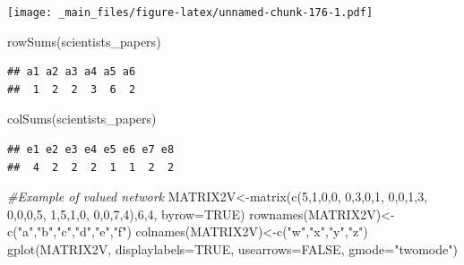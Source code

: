 \documentclass[
  notitlepage,
  onecolumn,
  openany]{book}
\newenvironment{Shaded}{\begin{snugshade}}{\end{snugshade}}
\newcommand{\AttributeTok}[1]{\textcolor[rgb]{0.77,0.63,0.00}{#1}}
\newcommand{\CommentTok}[1]{\textcolor[rgb]{0.56,0.35,0.01}{\textit{#1}}}
\newcommand{\ConstantTok}[1]{\textcolor[rgb]{0.00,0.00,0.00}{#1}}
\newcommand{\DecValTok}[1]{\textcolor[rgb]{0.00,0.00,0.81}{#1}}
\newcommand{\FunctionTok}[1]{\textcolor[rgb]{0.00,0.00,0.00}{#1}}
\newcommand{\NormalTok}[1]{#1}
\newcommand{\OtherTok}[1]{\textcolor[rgb]{0.56,0.35,0.01}{#1}}
\newcommand{\StringTok}[1]{\textcolor[rgb]{0.31,0.60,0.02}{#1}}
\begin{document}
\texttt{[image: \_main\_files/figure-latex/unnamed-chunk-176-1.pdf]}

\begin{Shaded}
\begin{Highlighting}[]
\FunctionTok{rowSums}\NormalTok{(scientists\_papers)}
\end{Highlighting}
\end{Shaded}

\begin{verbatim}
## a1 a2 a3 a4 a5 a6 
##  1  2  2  3  6  2
\end{verbatim}

\begin{Shaded}
\begin{Highlighting}[]
\FunctionTok{colSums}\NormalTok{(scientists\_papers)}
\end{Highlighting}
\end{Shaded}

\begin{verbatim}
## e1 e2 e3 e4 e5 e6 e7 e8 
##  4  2  2  2  1  1  2  2
\end{verbatim}

\begin{Shaded}
\begin{Highlighting}[]
\CommentTok{\#Example of valued network}
\NormalTok{MATRIX2V}\OtherTok{\textless{}{-}}\FunctionTok{matrix}\NormalTok{(}\FunctionTok{c}\NormalTok{(}\DecValTok{5}\NormalTok{,}\DecValTok{1}\NormalTok{,}\DecValTok{0}\NormalTok{,}\DecValTok{0}\NormalTok{,}
                   \DecValTok{0}\NormalTok{,}\DecValTok{3}\NormalTok{,}\DecValTok{0}\NormalTok{,}\DecValTok{1}\NormalTok{,}
                   \DecValTok{0}\NormalTok{,}\DecValTok{0}\NormalTok{,}\DecValTok{1}\NormalTok{,}\DecValTok{3}\NormalTok{,}
                   \DecValTok{0}\NormalTok{,}\DecValTok{0}\NormalTok{,}\DecValTok{0}\NormalTok{,}\DecValTok{5}\NormalTok{,}
                   \DecValTok{1}\NormalTok{,}\DecValTok{5}\NormalTok{,}\DecValTok{1}\NormalTok{,}\DecValTok{0}\NormalTok{,}
                   \DecValTok{0}\NormalTok{,}\DecValTok{0}\NormalTok{,}\DecValTok{7}\NormalTok{,}\DecValTok{4}\NormalTok{),}\DecValTok{6}\NormalTok{,}\DecValTok{4}\NormalTok{, }\AttributeTok{byrow=}\ConstantTok{TRUE}\NormalTok{)}
\FunctionTok{rownames}\NormalTok{(MATRIX2V)}\OtherTok{\textless{}{-}}\FunctionTok{c}\NormalTok{(}\StringTok{"a"}\NormalTok{,}\StringTok{"b"}\NormalTok{,}\StringTok{"c"}\NormalTok{,}\StringTok{"d"}\NormalTok{,}\StringTok{"e"}\NormalTok{,}\StringTok{"f"}\NormalTok{)}
\FunctionTok{colnames}\NormalTok{(MATRIX2V)}\OtherTok{\textless{}{-}}\FunctionTok{c}\NormalTok{(}\StringTok{"w"}\NormalTok{,}\StringTok{"x"}\NormalTok{,}\StringTok{"y"}\NormalTok{,}\StringTok{"z"}\NormalTok{)}
\FunctionTok{gplot}\NormalTok{(MATRIX2V, }\AttributeTok{displaylabels=}\ConstantTok{TRUE}\NormalTok{, }
      \AttributeTok{usearrows=}\ConstantTok{FALSE}\NormalTok{, }\AttributeTok{gmode=}\StringTok{"twomode"}\NormalTok{)}
\end{Highlighting}
\end{Shaded}
\end{document}
